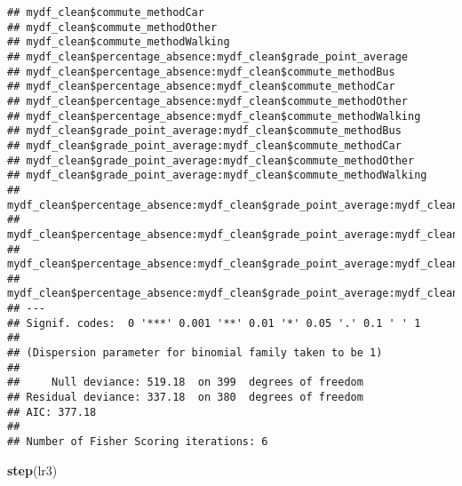 \documentclass[
]{article}
\newenvironment{Shaded}{\begin{snugshade}}{\end{snugshade}}
\newcommand{\FunctionTok}[1]{\textcolor[rgb]{0.13,0.29,0.53}{\textbf{#1}}}
\newcommand{\NormalTok}[1]{#1}
\begin{document}
\begin{verbatim}
## mydf_clean$commute_methodCar                                                                   
## mydf_clean$commute_methodOther                                                                 
## mydf_clean$commute_methodWalking                                                               
## mydf_clean$percentage_absence:mydf_clean$grade_point_average                                   
## mydf_clean$percentage_absence:mydf_clean$commute_methodBus                                     
## mydf_clean$percentage_absence:mydf_clean$commute_methodCar                                     
## mydf_clean$percentage_absence:mydf_clean$commute_methodOther                                   
## mydf_clean$percentage_absence:mydf_clean$commute_methodWalking                                 
## mydf_clean$grade_point_average:mydf_clean$commute_methodBus                                    
## mydf_clean$grade_point_average:mydf_clean$commute_methodCar                                    
## mydf_clean$grade_point_average:mydf_clean$commute_methodOther                                  
## mydf_clean$grade_point_average:mydf_clean$commute_methodWalking                                
## mydf_clean$percentage_absence:mydf_clean$grade_point_average:mydf_clean$commute_methodBus      
## mydf_clean$percentage_absence:mydf_clean$grade_point_average:mydf_clean$commute_methodCar      
## mydf_clean$percentage_absence:mydf_clean$grade_point_average:mydf_clean$commute_methodOther    
## mydf_clean$percentage_absence:mydf_clean$grade_point_average:mydf_clean$commute_methodWalking  
## ---
## Signif. codes:  0 '***' 0.001 '**' 0.01 '*' 0.05 '.' 0.1 ' ' 1
## 
## (Dispersion parameter for binomial family taken to be 1)
## 
##     Null deviance: 519.18  on 399  degrees of freedom
## Residual deviance: 337.18  on 380  degrees of freedom
## AIC: 377.18
## 
## Number of Fisher Scoring iterations: 6
\end{verbatim}

\begin{Shaded}
\begin{Highlighting}[]
\FunctionTok{step}\NormalTok{(lr3)}
\end{Highlighting}
\end{Shaded}
\end{document}
